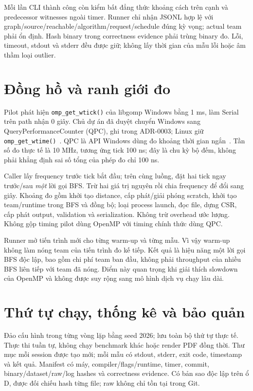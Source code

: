 Mỗi lần CLI thành công còn kiểm bất đẳng thức khoảng cách trên cạnh và predecessor witnesses ngoài timer. Runner chỉ nhận JSONL hợp lệ với graph/source/reachable/algorithm/request/schedule đúng kỳ vọng; actual team phải ổn định. Hash binary trong correctness evidence phải trùng binary đo. Lỗi, timeout, stdout và stderr đều được giữ; không lấy thời gian của mẫu lỗi hoặc âm thầm loại outlier.

\section{Đồng hồ và ranh giới đo}
Pilot phát hiện \texttt{omp\_get\_wtick()} của libgomp Windows bằng 1 ms, làm Serial trên path nhận 0 giây. Chủ dự án đã duyệt chuyển Windows sang QueryPerformanceCounter (QPC), ghi trong ADR-0003; Linux giữ \texttt{omp\_get\_wtime()}~\cite{openmpwtime}. QPC là API Windows dùng đo khoảng thời gian ngắn~\cite{microsoftqpc}. Tần số đo thực tế là 10 MHz, tương ứng tick 100 ns; đây là chu kỳ bộ đếm, không phải khẳng định sai số tổng của phép đo chỉ 100 ns.

Caller lấy frequency trước tick bắt đầu; trên cùng luồng, đặt hai tick ngay trước/sau \emph{một} lời gọi BFS. Trừ hai giá trị nguyên rồi chia frequency để đổi sang giây. Khoảng đo gồm khởi tạo distance, cấp phát/giải phóng scratch, khởi tạo team/runtime trong BFS và đồng bộ; loại process launch, đọc file, dựng CSR, cấp phát output, validation và serialization. Không trừ overhead ước lượng. Không gộp timing pilot dùng OpenMP với timing chính thức dùng QPC.

Runner mở tiến trình mới cho từng warm-up và từng mẫu. Vì vậy warm-up không làm nóng team của tiến trình đo kế tiếp. Kết quả là hiệu năng một lời gọi BFS độc lập, bao gồm chi phí team ban đầu, không phải throughput của nhiều BFS liên tiếp với team đã nóng. Điểm này quan trọng khi giải thích slowdown của OpenMP và không được suy rộng sang mô hình dịch vụ chạy lâu dài.

\section{Thứ tự chạy, thống kê và bảo quản}
Đảo cấu hình trong từng vòng lặp bằng seed 2026; lưu toàn bộ thứ tự thực tế. Thực thi tuần tự, không chạy benchmark khác hoặc render PDF đồng thời. Thư mục mỗi session được tạo mới; mỗi mẫu có stdout, stderr, exit code, timestamp và kết quả. Manifest có máy, compiler/flags/runtime, timer, commit, binary/dataset/raw/log hashes và correctness evidence. Có bản sao độc lập trên ổ D, được đối chiếu hash từng file; raw không chỉ tồn tại trong Git.

